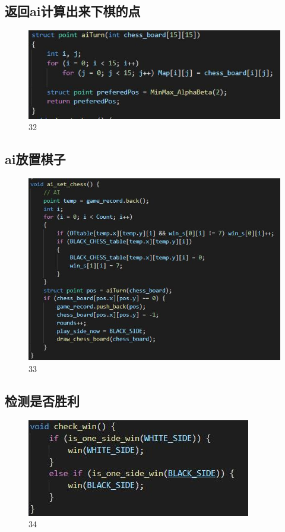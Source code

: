 \documentclass[UTF8]{ctexart}
\begin{document}
\subsection{返回ai计算出来下棋的点}
\begin{figure}[H]
    \centering
    \includegraphics[scale=1.0]{31.jpg}
\caption{32}
\end{figure}
\subsection{ai放置棋子}
\begin{figure}[H]
    \centering
    \includegraphics[scale=1.0]{32.jpg}
\caption{33}
\end{figure}
\subsection{检测是否胜利}
\begin{figure}[H]
    \centering
    \includegraphics[scale=1.0]{33.jpg}
\caption{34}
\end{figure}
\end{document}
